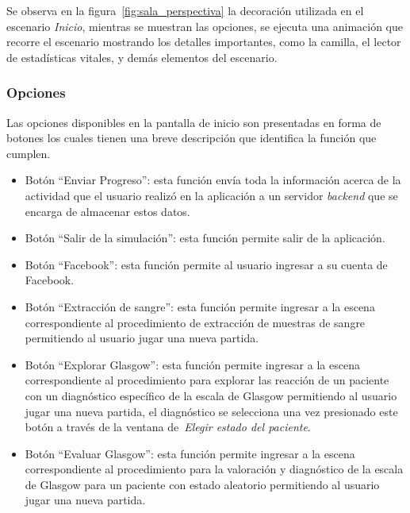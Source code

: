 
Se observa en la figura~\ref{fig:sala_perspectiva} la decoración utilizada en
el escenario \emph{Inicio}, mientras se muestran las opciones, se ejecuta una
animación que recorre el escenario mostrando los detalles importantes, como la
camilla, el lector de estadísticas vitales, y demás elementos del escenario.

\subsubsection{Opciones}


Las opciones disponibles en la pantalla de inicio son presentadas en forma de
botones los cuales tienen una breve descripción que identifica la función que
cumplen. 

\begin{itemize}
\item Botón \enquote{Enviar Progreso}: esta función envía toda la información
    acerca de la actividad que el usuario realizó en la aplicación a un servidor
    \emph{backend} que se encarga de almacenar estos datos.
\item Botón \enquote{Salir de la simulación}: esta función permite salir de la
    aplicación.
\item Botón \enquote{Facebook}: esta función permite al usuario ingresar a su
    cuenta de Facebook.
\item Botón \enquote{Extracción de sangre}: esta función permite ingresar a la
    escena correspondiente al procedimiento de extracción de muestras de sangre
    permitiendo al usuario jugar una nueva partida.
\item Botón \enquote{Explorar Glasgow}: esta función permite ingresar a la
    escena correspondiente al procedimiento para explorar las reacción de un
    paciente con un diagnóstico específico de la escala de Glasgow permitiendo
    al usuario jugar una nueva partida, el diagnóstico se selecciona una vez
    presionado este botón a través de la ventana de~\emph{Elegir estado del
        paciente}.
\item Botón \enquote{Evaluar Glasgow}: esta función permite ingresar a la escena
    correspondiente al procedimiento para la valoración y diagnóstico de la
    escala de Glasgow para un paciente con estado aleatorio permitiendo al
    usuario jugar una nueva partida.
\end{itemize}


